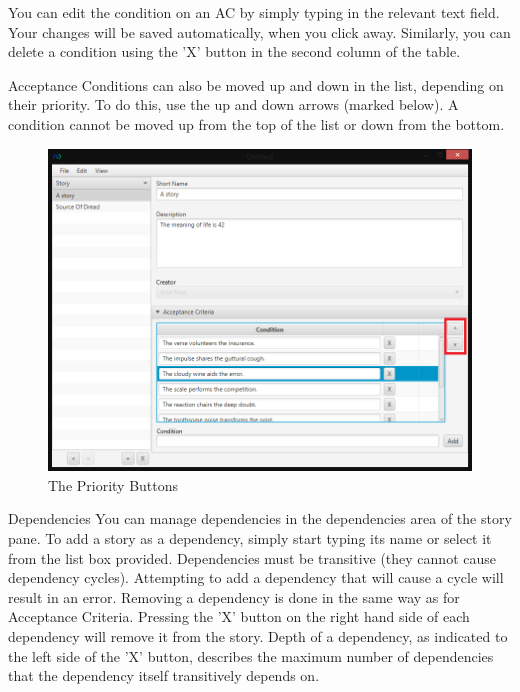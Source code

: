 You can edit the condition on an AC by simply typing in the relevant text field. Your changes will be saved automatically, when you click away. Similarly, you can delete a condition using the 'X' button in the second column of the table.
\newline\newline

Acceptance Conditions can also be moved up and down in the list, depending on their priority. To do this, use the up and down arrows (marked below). A condition cannot be moved up from the top of the list or down from the bottom.

\begin{figure}[H]
\centering
\includegraphics[width=\textwidth]{images/screenshots/AcceptanceCriteria3.PNG}
\caption{The Priority Buttons}
\label{fig:new_project}
\end{figure}

Dependencies\newline
You can manage dependencies in the dependencies area of the story pane. To add a story as a dependency, simply start typing its name or select it from the list box provided. Dependencies must be transitive (they cannot cause dependency cycles). Attempting to add a dependency that will cause a cycle will result in an error.\newline
Removing a dependency is done in the same way as for Acceptance Criteria. Pressing the 'X' button on the right hand side of each dependency will remove it from the story.\newline
Depth of a dependency, as indicated to the left side of the 'X' button, describes the maximum number of dependencies that the dependency itself transitively depends on.\newline\newline


